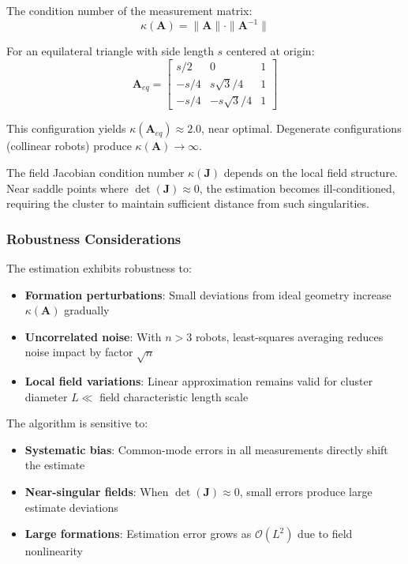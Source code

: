 \documentclass[lettersize,journal]{IEEEtran}
\begin{document}
The condition number of the measurement matrix:
\begin{equation}
\kappa(\mathbf{A}) = \|\mathbf{A}\| \cdot \|\mathbf{A}^{-1}\|
\end{equation}

For an equilateral triangle with side length $s$ centered at origin:
\begin{equation}
\mathbf{A}_{eq} = \begin{bmatrix} 
s/2 & 0 & 1 \\
-s/4 & s\sqrt{3}/4 & 1 \\
-s/4 & -s\sqrt{3}/4 & 1
\end{bmatrix}
\end{equation}

This configuration yields $\kappa(\mathbf{A}_{eq}) \approx 2.0$, near optimal. Degenerate configurations (collinear robots) produce $\kappa(\mathbf{A}) \to \infty$.

The field Jacobian condition number $\kappa(\mathbf{J})$ depends on the local field structure. Near saddle points where $\det(\mathbf{J}) \approx 0$, the estimation becomes ill-conditioned, requiring the cluster to maintain sufficient distance from such singularities.

\subsubsection{Robustness Considerations}

The estimation exhibits robustness to:
\begin{itemize}
\item \textbf{Formation perturbations}: Small deviations from ideal geometry increase $\kappa(\mathbf{A})$ gradually
\item \textbf{Uncorrelated noise}: With $n > 3$ robots, least-squares averaging reduces noise impact by factor $\sqrt{n}$
\item \textbf{Local field variations}: Linear approximation remains valid for cluster diameter $L \ll$ field characteristic length scale
\end{itemize}

The algorithm is sensitive to:
\begin{itemize}
\item \textbf{Systematic bias}: Common-mode errors in all measurements directly shift the estimate
\item \textbf{Near-singular fields}: When $\det(\mathbf{J}) \approx 0$, small errors produce large estimate deviations
\item \textbf{Large formations}: Estimation error grows as $\mathcal{O}(L^2)$ due to field nonlinearity
\end{itemize}
\end{document}
